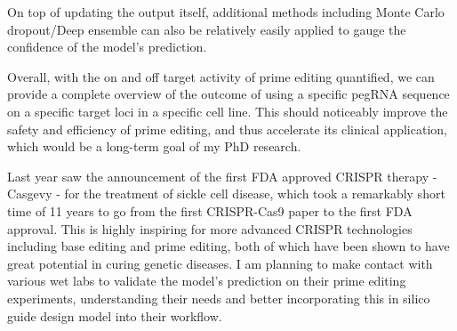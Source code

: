 \documentclass[a4,12pt]{article}
\begin{document}
On top of updating the output itself, additional methods including Monte Carlo dropout\parencite{galDropoutBayesianApproximation2016}/Deep ensemble\cite{lakshminarayananSimpleScalablePredictive2017} can also be relatively easily applied to gauge the confidence of the model's prediction.



Overall, with the on and off target activity of prime editing quantified, we can provide a complete overview of the outcome of using a specific pegRNA sequence on a specific target loci in a specific cell line. This should noticeably improve the safety and efficiency of prime editing, and thus accelerate its clinical application, which would be a long-term goal of my PhD research. 

Last year saw the announcement of the first FDA approved CRISPR therapy - Casgevy - for the treatment of sickle cell disease, which took a remarkably short time of 11 years to go from the first CRISPR-Cas9 paper to the first FDA approval\cite{CRISPRClinicalTrials}. This is highly inspiring for more advanced CRISPR technologies including base editing and prime editing, both of which have been shown to have great potential in curing genetic diseases. I am planning to make contact with various wet labs to validate the model's prediction on their prime editing experiments, understanding their needs and better incorporating this in silico guide design model into their workflow. 

\printbibliography
\end{document}
